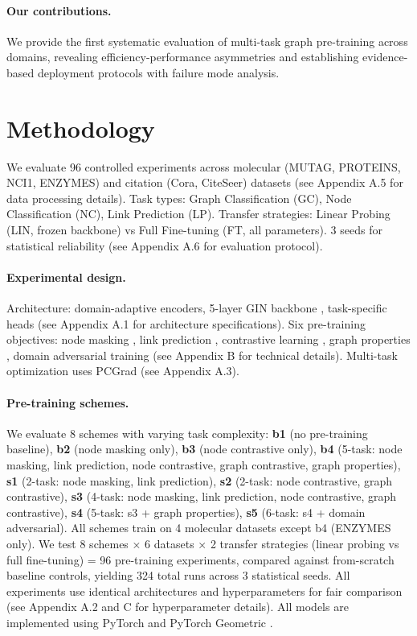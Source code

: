 \documentclass[11pt]{article}
\begin{document}
\paragraph{Our contributions.} We provide the first systematic evaluation of multi-task graph pre-training across domains, revealing efficiency-performance asymmetries and establishing evidence-based deployment protocols with failure mode analysis.


\section{Methodology}

We evaluate 96 controlled experiments across molecular (MUTAG, PROTEINS, NCI1, ENZYMES) and citation (Cora, CiteSeer) datasets \citep{tudataset,sen2008collective} (see Appendix A.5 for data processing details). Task types: Graph Classification (GC), Node Classification (NC), Link Prediction (LP). Transfer strategies: Linear Probing (LIN, frozen backbone) vs Full Fine-tuning (FT, all parameters). 3 seeds for statistical reliability (see Appendix A.6 for evaluation protocol).

\paragraph{Experimental design.} Architecture: domain-adaptive encoders, 5-layer GIN backbone \citep{xu2019how}, task-specific heads (see Appendix A.1 for architecture specifications). Six pre-training objectives: node masking \citep{hou2022graphmae}, link prediction \citep{liben2007link}, contrastive learning \citep{you2020graphcl}, graph properties \citep{newman2003structure}, domain adversarial training \citep{ganin2016dann} (see Appendix B for technical details). Multi-task optimization uses PCGrad \citep{yu2020pcgrad} (see Appendix A.3).

\paragraph{Pre-training schemes.} We evaluate 8 schemes with varying task complexity: \textbf{b1} (no pre-training baseline), \textbf{b2} (node masking only), \textbf{b3} (node contrastive only), \textbf{b4} (5-task: node masking, link prediction, node contrastive, graph contrastive, graph properties), \textbf{s1} (2-task: node masking, link prediction), \textbf{s2} (2-task: node contrastive, graph contrastive), \textbf{s3} (4-task: node masking, link prediction, node contrastive, graph contrastive), \textbf{s4} (5-task: s3 + graph properties), \textbf{s5} (6-task: s4 + domain adversarial). All schemes train on 4 molecular datasets except b4 (ENZYMES only). We test 8 schemes × 6 datasets × 2 transfer strategies (linear probing \citep{chen2020simple} vs full fine-tuning) = 96 pre-training experiments, compared against from-scratch baseline controls, yielding 324 total runs across 3 statistical seeds. All experiments use identical architectures and hyperparameters for fair comparison (see Appendix A.2 and C for hyperparameter details). All models are implemented using PyTorch \citep{paszke2019pytorch} and PyTorch Geometric \citep{fey2019fast}.
\end{document}
